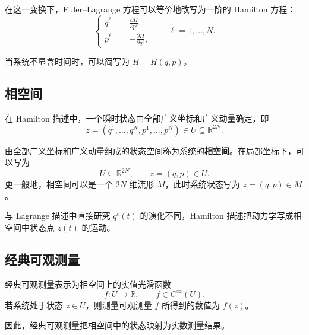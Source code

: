 \documentclass[UTF8,a4paper,11pt,openany]{ctexbook}
\begin{document}
在这一变换下，Euler--Lagrange 方程可以等价地改写为一阶的 Hamilton 方程：
\begin{equation}
    \left\{
    \begin{aligned}
        \dot q^\ell
        &=
        \frac{\partial H}{\partial p^\ell},\\
        \dot p^\ell
        &=
        -\frac{\partial H}{\partial q^\ell},
    \end{aligned}
    \right.
    \qquad
    \ell=1,\ldots,N.
\end{equation}

当系统不显含时间时，可以简写为 $H=H(q,p)$。

\subsection{相空间}

在 Hamilton 描述中，一个瞬时状态由全部广义坐标和广义动量确定，即
\[
z=
(q^1,\ldots,q^N,p^1,\ldots,p^N)
\in U\subseteq\mathbb R^{2N}.
\]

\begin{definition}[相空间]
由全部广义坐标和广义动量组成的状态空间称为系统的\textbf{相空间}。在局部坐标下，可以写为
\begin{equation}
    U\subseteq\mathbb R^{2N},
    \qquad
    z=(q,p)\in U.
\end{equation}
更一般地，相空间可以是一个 $2N$ 维流形 $M$，此时系统状态写为 $z=(q,p)\in M$。
\end{definition}

与 Lagrange 描述中直接研究 $q^\ell(t)$ 的演化不同，Hamilton 描述把动力学写成相空间中状态点 $z(t)$ 的运动。

\subsection{经典可观测量}

\begin{definition}[经典可观测量]
经典可观测量表示为相空间上的实值光滑函数
\begin{equation}
    f:U\longrightarrow\mathbb R,
    \qquad
    f\in C^\infty(U).
\end{equation}
若系统处于状态 $z\in U$，则测量可观测量 $f$ 所得到的数值为 $f(z)$。
\end{definition}

因此，经典可观测量把相空间中的状态映射为实数测量结果。
\end{document}
